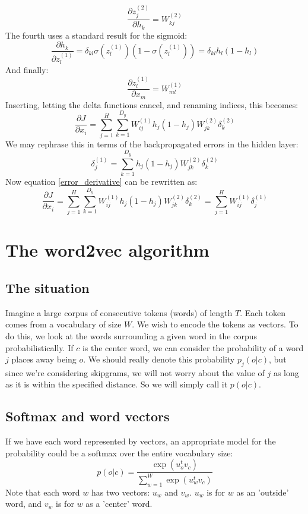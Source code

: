 \documentclass[12pt, a4paper]{article}
\numberwithin{equation}{section}
\begin{document}
\begin{equation}
\frac{\partial z^{(2)}_j}{\partial h_k}=W^{(2)}_{kj}
\end{equation}
The fourth uses a standard result for the sigmoid:
\begin{equation}
\frac{\partial h_k}{\partial z^{(1)}_l}=\delta_{kl}\sigma(z^{(1)}_l)(1-\sigma(z^{(1)}_l))=\delta_{kl}h_l(1-h_l)
\end{equation}
And finally:
\begin{equation}
\frac{\partial z^{(1)}_l}{\partial x_m}=W^{(1)}_{ml}
\end{equation}
Inserting, letting the delta functions cancel, and renaming indices, this becomes:
\begin{equation}
\label{error_derivative}
\frac{\partial J}{\partial x_i}=\sum_{j=1}^H\sum_{k=1}^{D_y}W^{(1)}_{ij}h_j(1-h_j)W^{(2)}_{jk}\delta^{(2)}_k
\end{equation}
We may rephrase this in terms of the backpropagated errors in the hidden layer:
\begin{equation}
\delta^{(1)}_j=\sum_{k=1}^{D_y}h_j(1-h_j)W^{(2)}_{jk}\delta^{(2)}_k
\end{equation}
Now equation \ref{error_derivative} can be rewritten as:
\begin{equation}
\frac{\partial J}{\partial x_i}=\sum_{j=1}^H\sum_{k=1}^{D_y}W^{(1)}_{ij}h_j(1-h_j)W^{(2)}_{jk}\delta^{(2)}_k=\sum_{j=1}^H W^{(1)}_{ij}\delta^{(1)}_j
\end{equation}

\section{The word2vec algorithm}

\subsection{The situation}
Imagine a large corpus of consecutive tokens (words) of length $T$. Each token comes from a vocabulary of size $W$. We wish to encode the tokens as vectors. To do this, we look at the words surrounding a given word in the corpus probabilistically. If $c$ is the center word, we can consider the probability of a word $j$ places away being $o$. We should really denote this probability $p_j(o|c)$, but since we're considering skipgrams, we will not worry about the value of $j$ as long as it is within the specified distance. So we will simply call it $p(o|c)$.

\subsection{Softmax and word vectors}
If we have each word represented by vectors, an appropriate model for the probability could be a softmax over the entire vocabulary size:
\begin{equation}
p(o|c)=\frac{\exp(u_o^t v_c)}{\sum_{w=1}^W\exp(u_w^t v_c)}
\end{equation}
Note that each word $w$ has two vectors: $u_w$ and $v_w$. $u_w$ is for $w$ as an 'outside' word, and $v_w$ is for $w$ as a 'center' word.
\end{document}
